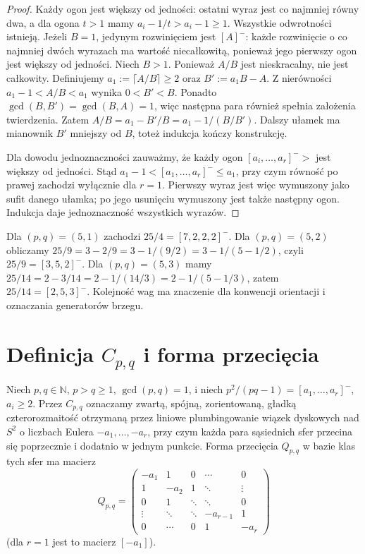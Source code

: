 \begin{proof}
Każdy ogon jest większy od jedności: ostatni wyraz
jest co najmniej równy dwa, a dla ogona $t>1$
mamy $a_i-1/t>a_i-1\geq1$.
Wszystkie odwrotności istnieją.
Jeżeli $B=1$, jedynym rozwinięciem jest $[A]^-$: każde
rozwinięcie o co najmniej dwóch wyrazach ma wartość niecałkowitą,
ponieważ jego pierwszy ogon jest większy od jedności. Niech
$B>1$. Ponieważ $A/B$ jest nieskracalny, nie jest całkowity.
Definiujemy $a_1:=\lceil A/B\rceil\geq2$ oraz
$B':=a_1B-A$. Z nierówności
$a_1-1<A/B<a_1$ wynika $0<B'<B$.
Ponadto $\gcd(B,B')=\gcd(B,A)=1$,
więc następna para również spełnia założenia twierdzenia.
Zatem
$A/B=a_1-B'/B=a_1-1/(B/B')$.
Dalszy ułamek ma mianownik $B'$ mniejszy od $B$, toteż
indukcja kończy konstrukcję.

Dla dowodu jednoznaczności zauważmy, że każdy ogon
$[a_i,\ldots,a_r]^->$ jest większy od jedności. Stąd
$a_1-1<[a_1,\ldots,a_r]^-\leq a_1$, przy czym równość
po prawej zachodzi wyłącznie dla $r=1$.
Pierwszy wyraz jest więc wymuszony jako sufit danego ułamka;
po jego usunięciu wymuszony jest także następny ogon.
Indukcja daje jednoznaczność wszystkich wyrazów.
\end{proof}

\begin{przyklad}
Dla $(p,q)=(5,1)$ zachodzi $25/4=[7,2,2,2]^-$.
Dla $(p,q)=(5,2)$ obliczamy
$25/9=3-2/9=3-1/(9/2)=3-1/(5-1/2)$, czyli
$25/9=[3,5,2]^-$. Dla $(p,q)=(5,3)$ mamy
$25/14=2-3/14=2-1/(14/3)=2-1/(5-1/3)$,
zatem $25/14=[2,5,3]^-$. Kolejność wag ma znaczenie dla
konwencji orientacji i oznaczania generatorów brzegu.
\end{przyklad}

\section{Definicja \texorpdfstring{$C_{p,q}$}{Cpq} i forma przecięcia}
\label{sec:tg-general-config}

\begin{definicja}[Konfiguracja $C_{p,q}$]
Niech $p,q\in\mathbb N$, $p>q\geq1$, $\gcd(p,q)=1$, i niech
$p^2/(pq-1)=[a_1,\ldots,a_r]^-$, $a_i\geq2$.
Przez $C_{p,q}$ oznaczamy zwartą, spójną, zorientowaną,
gładką czterorozmaitość otrzymaną przez liniowe plumbingowanie
wiązek dyskowych nad $S^2$ o liczbach Eulera
$-a_1,\ldots,-a_r$, przy czym każda para sąsiednich sfer
przecina się poprzecznie i dodatnio w jednym punkcie.
Forma przecięcia $Q_{p,q}$ w bazie klas tych sfer ma macierz
\[
Q_{p,q}=\begin{pmatrix}
-a_1&1&0&\cdots&0\\
1&-a_2&1&\ddots&\vdots\\
0&1&\ddots&\ddots&0\\
\vdots&\ddots&\ddots&-a_{r-1}&1\\
0&\cdots&0&1&-a_r
\end{pmatrix}
\]
(dla $r=1$ jest to macierz $[-a_1]$).
\end{definicja}

